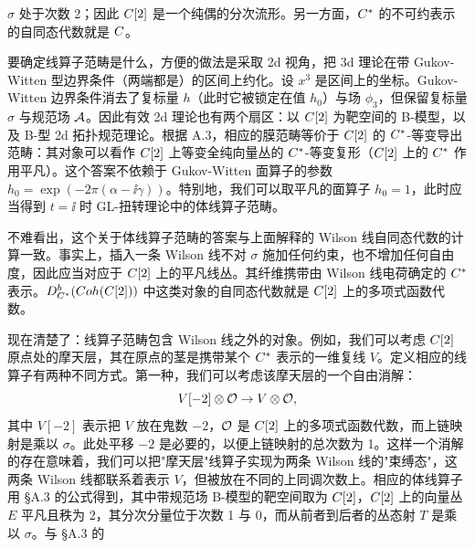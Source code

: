 $\sigma$ 处于次数 2；因此 $C[2]$ 是一个纯偶的分次流形。另一方面，$C^*$ 的不可约表示的自同态代数就是 $C$。


要确定线算子范畴是什么，方便的做法是采取 2d 视角，把 3d 理论在带 Gukov-Witten 型边界条件（两端都是）的区间上约化。设 $x^3$ 是区间上的坐标。Gukov-Witten 边界条件消去了复标量 $h$（此时它被锁定在值 $h_0$）与场 $\phi_3$，但保留复标量 $\sigma$ 与规范场 $\mathcal{A}$。因此有效 2d 理论也有两个扇区：以 $C[2]$ 为靶空间的 B-模型，以及 B-型 2d 拓扑规范理论。根据 A.3，相应的膜范畴等价于 $C[2]$ 的 $C^*$-等变导出范畴：其对象可以看作 $C[2]$ 上等变全纯向量丛的 $C^*$-等变复形（$C[2]$ 上的 $C^*$ 作用平凡）。这个答案不依赖于 Gukov-Witten 面算子的参数 $h_0=\exp(-2\pi(\alpha-\ii\gamma))$。特别地，我们可以取平凡的面算子 $h_0=1$，此时应当得到 $t=\ii$ 时 GL-扭转理论中的体线算子范畴。

不难看出，这个关于体线算子范畴的答案与上面解释的 Wilson 线自同态代数的计算一致。事实上，插入一条 Wilson 线不对 $\sigma$ 施加任何约束，也不增加任何自由度，因此应当对应于 $C[2]$ 上的平凡线丛。其纤维携带由 Wilson 线电荷确定的 $C^*$ 表示。$D^b_{C^*}(Coh(C[2]))$ 中这类对象的自同态代数就是 $C[2]$ 上的多项式函数代数。


现在清楚了：线算子范畴包含 Wilson 线之外的对象。例如，我们可以考虑 $C[2]$ 原点处的摩天层，其在原点的茎是携带某个 $C^*$ 表示的一维复线 $V$。定义相应的线算子有两种不同方式。第一种，我们可以考虑该摩天层的一个自由消解：
\[
V[-2]\otimes\mathcal{O}\to V\otimes\mathcal{O} ,
\]
其中 $V[-2]$ 表示把 $V$ 放在鬼数 $-2$，$\mathcal{O}$ 是 $C[2]$ 上的多项式函数代数，而上链映射是乘以 $\sigma$。此处平移 $-2$ 是必要的，以便上链映射的总次数为 1。这样一个消解的存在意味着，我们可以把"摩天层"线算子实现为两条 Wilson 线的"束缚态"，这两条 Wilson 线都联系着表示 $V$，但被放在不同的上同调次数上。相应的体线算子用 §A.3 的公式得到，其中带规范场 B-模型的靶空间取为 $C[2]$，$C[2]$ 上的向量丛 $E$ 平凡且秩为 2，其分次分量位于次数 1 与 0，而从前者到后者的丛态射 $T$ 是乘以 $\sigma$。与 §A.3 的

